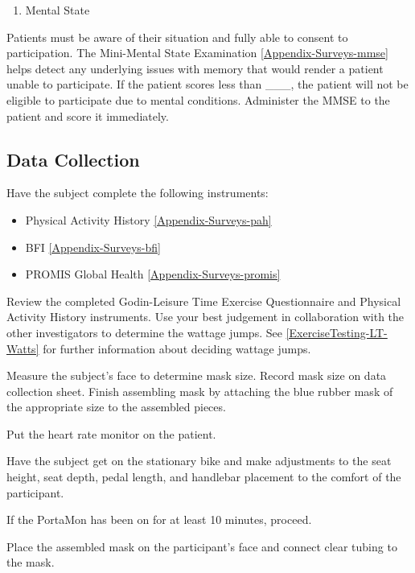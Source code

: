 \documentclass[
]{book}
\providecommand{\tightlist}{%
  \setlength{\itemsep}{0pt}\setlength{\parskip}{0pt}}
\begin{document}
\begin{enumerate}
\def\labelenumi{\arabic{enumi}.}
\setcounter{enumi}{2}
\tightlist
\item
  Mental State
\end{enumerate}

Patients must be aware of their situation and fully able to consent to participation. The Mini-Mental State Examination \ref{Appendix-Surveys-mmse} helps detect any underlying issues with memory that would render a patient unable to participate. If the patient scores less than \_\_\_, the patient will not be eligible to participate due to mental conditions. Administer the MMSE to the patient and score it immediately.

\hypertarget{Methods-LT-DataCollection}{%
\subsection{Data Collection}\label{Methods-LT-DataCollection}}

Have the subject complete the following instruments:

\begin{itemize}
\tightlist
\item
  Physical Activity History \ref{Appendix-Surveys-pah}
\item
  BFI \ref{Appendix-Surveys-bfi}
\item
  PROMIS Global Health \ref{Appendix-Surveys-promis}
\end{itemize}

Review the completed Godin-Leisure Time Exercise Questionnaire and Physical Activity History instruments. Use your best judgement in collaboration with the other investigators to determine the wattage jumps. See \ref{ExerciseTesting-LT-Watts} for further information about deciding wattage jumps.

Measure the subject's face to determine mask size. Record mask size on data collection sheet. Finish assembling mask by attaching the blue rubber mask of the appropriate size to the assembled pieces.

Put the heart rate monitor on the patient.

Have the subject get on the stationary bike and make adjustments to the seat height, seat depth, pedal length, and handlebar placement to the comfort of the participant.

If the PortaMon has been on for at least 10 minutes, proceed.

Place the assembled mask on the participant's face and connect clear tubing to the mask.
\end{document}
